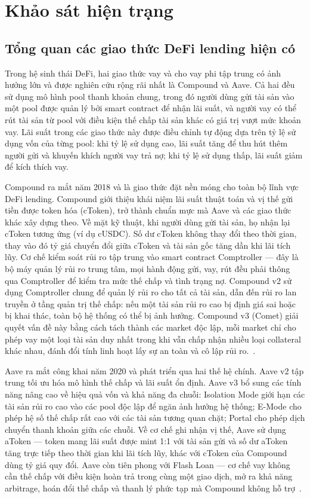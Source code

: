 \documentclass[../DoAn.tex]{subfiles}
\begin{document}
\section{Khảo sát hiện trạng}


\subsection{Tổng quan các giao thức DeFi lending hiện có}


Trong hệ sinh thái DeFi, hai giao thức vay và cho vay phi tập trung có ảnh hưởng lớn và được nghiên cứu rộng rãi nhất là Compound và Aave. Cả hai đều sử dụng mô hình pool thanh khoản chung, trong đó người dùng gửi tài sản vào một pool được quản lý bởi smart contract để nhận lãi suất, và người vay có thể rút tài sản từ pool với điều kiện thế chấp tài sản khác có giá trị vượt mức khoản vay. Lãi suất trong các giao thức này được điều chỉnh tự động dựa trên tỷ lệ sử dụng vốn của từng pool: khi tỷ lệ sử dụng cao, lãi suất tăng để thu hút thêm người gửi và khuyến khích người vay trả nợ; khi tỷ lệ sử dụng thấp, lãi suất giảm để kích thích vay.

Compound ra mắt năm 2018 và là giao thức đặt nền móng cho toàn bộ lĩnh vực DeFi lending. Compound giới thiệu khái niệm lãi suất thuật toán và vị thế gửi tiền được token hóa (cToken), trở thành chuẩn mực mà Aave và các giao thức khác xây dựng theo. Về mặt kỹ thuật, khi người dùng gửi tài sản, họ nhận lại cToken tương ứng (ví dụ cUSDC). Số dư cToken không thay đổi theo thời gian, thay vào đó tỷ giá chuyển đổi giữa cToken và tài sản gốc tăng dần khi lãi tích lũy. Cơ chế kiểm soát rủi ro tập trung vào smart contract Comptroller --- đây là bộ máy quản lý rủi ro trung tâm, mọi hành động gửi, vay, rút đều phải thông qua Comptroller để kiểm tra mức thế chấp và tình trạng nợ. Compound v2 sử dụng Comptroller chung để quản lý rủi ro cho tất cả tài sản, dẫn đến rủi ro lan truyền ở tầng quản trị thế chấp: nếu một tài sản rủi ro cao bị định giá sai hoặc bị khai thác, toàn bộ hệ thống có thể bị ảnh hưởng. Compound v3 (Comet) giải quyết vấn đề này bằng cách tách thành các market độc lập, mỗi market chỉ cho phép vay một loại tài sản duy nhất trong khi vẫn chấp nhận nhiều loại collateral khác nhau, đánh đổi tính linh hoạt lấy sự an toàn và cô lập rủi ro.~\cite{CompoundWhitepaper,CompoundV2Docs,CompoundIIIDocs}.

Aave ra mắt công khai năm 2020 và phát triển qua hai thế hệ chính. Aave v2 tập trung tối ưu hóa mô hình thế chấp và lãi suất ổn định. Aave v3 bổ sung các tính năng nâng cao về hiệu quả vốn và khả năng đa chuỗi: Isolation Mode giới hạn các tài sản rủi ro cao vào các pool độc lập để ngăn ảnh hưởng hệ thống; E-Mode cho phép hệ số thế chấp rất cao với các tài sản tương quan chặt; Portal cho phép dịch chuyển thanh khoản giữa các chuỗi. Về cơ chế ghi nhận vị thế, Aave sử dụng aToken --- token mang lãi suất được mint 1:1 với tài sản gửi và số dư aToken tăng trực tiếp theo thời gian khi lãi tích lũy, khác với cToken của Compound dùng tỷ giá quy đổi. Aave còn tiên phong với Flash Loan --- cơ chế vay không cần thế chấp với điều kiện hoàn trả trong cùng một giao dịch, mở ra khả năng arbitrage, hoán đổi thế chấp và thanh lý phức tạp mà Compound không hỗ trợ~\cite{AaveV2Whitepaper,AaveV3TechPaper}.
\end{document}
